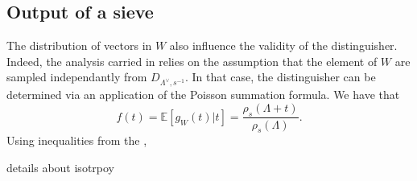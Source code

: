 \documentclass{article}
\begin{document}
\subsection{Output of a sieve}

The distribution of vectors in $W$ also influence the validity of the distinguisher. Indeed, the analysis carried in \cite{PoulyShen} relies on the assumption that the element of $W$ are sampled independantly from $D_{\Lambda^\vee ,s^{-1}}$. In that case, the distinguisher can be determined via an application of the Poisson summation formula. We have that 
\[f(t) = \mathbb E[g_W(t)|t ] = \frac{\rho_s(\Lambda + t)}{\rho_s(\Lambda)}.\] 
Using inequalities from the ,

details about isotrpoy 




\end{document}
